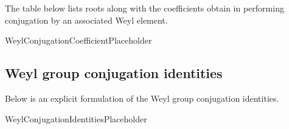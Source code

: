 \documentclass[11pt]{article}
\newcommand{\noi}{\noindent}
\theoremstyle{definition}
\begin{document}
\noi The table below lists roots along with the coefficients obtain in performing conjugation by an associated Weyl element.

WeylConjugationCoefficientPlaceholder

\subsection{Weyl group conjugation identities}

\noi Below is an explicit formulation of the Weyl group conjugation identities.

WeylConjugationIdentitiesPlaceholder
\end{document}
